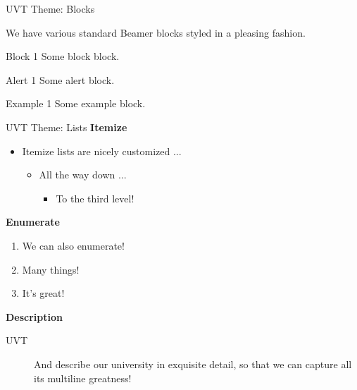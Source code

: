 \documentclass[aspectratio=43]{beamer}
\begin{document}
\begin{frame}{UVT Theme: Blocks}

We have various standard Beamer blocks styled in a pleasing fashion.

\begin{block}{Block 1}
Some block block.
\end{block}

\begin{alertblock}{Alert 1}
Some alert block.
\end{alertblock}

\begin{exampleblock}{Example 1}
Some example block.
\end{exampleblock}
\end{frame}

\begin{frame}{UVT Theme: Lists}
\small
\textbf{Itemize}

\begin{itemize}
    \item Itemize lists are nicely customized ...
    \begin{itemize}
        \item All the way down ...
        \begin{itemize}
            \item To the third level!
        \end{itemize}
    \end{itemize}
\end{itemize}

\textbf{Enumerate}

\begin{enumerate}
    \item We can also enumerate!
    \item Many things!
    \item It's great!
\end{enumerate}

\textbf{Description}

\begin{description}
    \item[UVT] And describe our university in exquisite detail, so that we
        can capture all its multiline greatness!
\end{description}
\end{frame}
\end{document}
